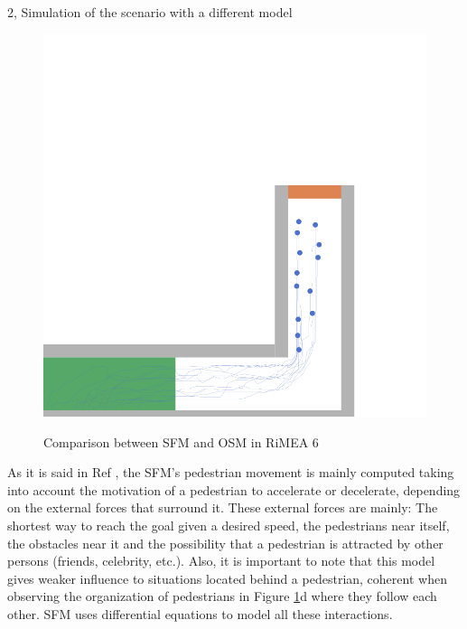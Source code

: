 \begin{task}{2, Simulation of the scenario with a different model}
\begin{figure}[H]
{\includegraphics[scale=0.35]{report-template/images/rimea6_optimal_finish.png}}
\caption{Comparison between SFM and OSM in RiMEA 6}
\label{rimea6sfm}
\end{figure}

As it is said in Ref \cite{helbing1995social}, the SFM's pedestrian movement is mainly computed taking into account the motivation of a pedestrian to accelerate or decelerate, depending on the external forces that surround it. These external forces are mainly: The shortest way to reach the goal given a desired speed, the pedestrians near itself, the obstacles near it and the possibility that a pedestrian is attracted by other persons (friends, celebrity, etc.). Also, it is important to note that this model gives weaker influence to situations located behind a pedestrian, coherent when observing the organization of pedestrians in Figure \ref{rimea6sfm}d where they follow each other. SFM uses differential equations to model all these interactions. 


\end{task}
